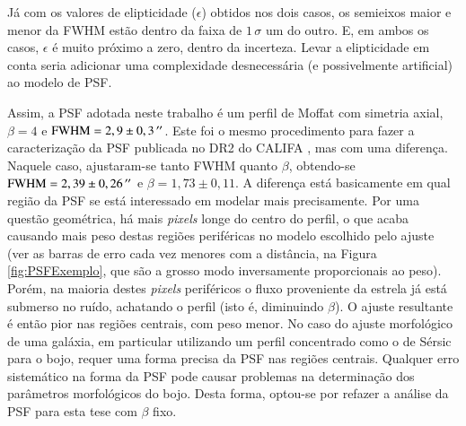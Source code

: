 Já com os valores de elipticidade ($\epsilon$) obtidos nos dois casos, os
semieixos maior e menor da FWHM estão dentro da faixa de $1\,\sigma$ um do
outro. E, em ambos os casos, $\epsilon$ é muito próximo a zero, dentro da
incerteza. Levar a elipticidade em conta seria adicionar uma complexidade
desnecessária (e possivelmente artificial) ao modelo de PSF.

Assim, a PSF adotada neste trabalho é um perfil de Moffat com simetria axial,
$\beta\!=\!4$ e $\mathrm{FWHM}=2,9 \pm 0,3\,^{\prime\prime}$. Este foi o mesmo
procedimento para fazer a caracterização da PSF publicada no DR2 do CALIFA
\citep{GarciaBenito2015}, mas com uma diferença. Naquele caso, ajustaram-se
tanto FWHM quanto $\beta$, obtendo-se $\mathrm{FWHM}=2,39 \pm 0,26\,^{\prime\prime}$ e
$\beta=1,73 \pm 0,11$. A diferença está basicamente em qual região da PSF se
está interessado em modelar mais precisamente. Por uma questão geométrica, há
mais {\em pixels} longe do centro do perfil, o que acaba causando mais peso
destas regiões periféricas no modelo escolhido pelo ajuste (ver as barras de
erro cada vez menores com a distância, na Figura \ref{fig:PSFExemplo}, que são a
grosso modo inversamente proporcionais ao peso). Porém, na maioria destes {\em
pixels} periféricos o fluxo proveniente da estrela já está submerso no ruído,
achatando o perfil (isto é, diminuindo $\beta$). O ajuste resultante é então
pior nas regiões centrais, com peso menor.
No caso do ajuste morfológico de uma galáxia, em particular utilizando um perfil
concentrado como o de Sérsic para o bojo, requer uma forma precisa da PSF nas
regiões centrais. Qualquer erro sistemático na forma da PSF pode causar
problemas na determinação dos parâmetros morfológicos do bojo.
Desta forma, optou-se por refazer a análise da PSF para esta tese com $\beta$
fixo.

%


